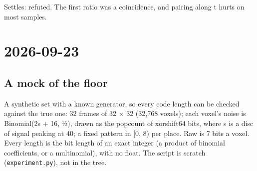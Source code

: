 Settles: refuted. The first ratio was a coincidence, and pairing along t hurts on most samples.

\section{\texorpdfstring{2026-09-23}{2026-09-23}}

\subsection{\texorpdfstring{A mock of the floor}{A mock of the floor}}

A synthetic set with a known generator, so every code length can be checked against the true one: 32 frames of 32 × 32 (32,768 voxels); each voxel's noise is Binomial(2s + 16, ½), drawn as the popcount of xorshift64 bits, where s is a disc of signal peaking at 40; a fixed pattern in [0, 8) per place. Raw is 7 bits a voxel. Every length is the bit length of an exact integer (a product of binomial coefficients, or a multinomial), with no float. The script is scratch (\texttt{experiment.\allowbreak{}py}), not in the tree.

